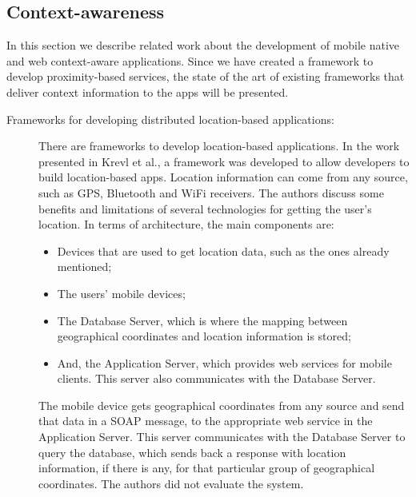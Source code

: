 \subsection{Context-awareness}
\label{sub:frameworks_context_aware}
In this section we describe related work about the
development of mobile native and web
context-aware applications.
Since we have created a framework to develop
proximity-based services, the state
of the art of existing frameworks that deliver
context information to the apps will be presented.
\begin{description}
  \item[Frameworks for developing distributed
  location-based applications:]
  There are frameworks to develop location-based
  applications.
  In the work presented in Krevl et al.\cite{Krevl2006},
  a framework
  was developed to allow developers to build
  location-based apps. Location information can come
  from any source, such as \gls{GPS}, Bluetooth and \gls{WiFi} receivers.
  The authors discuss some benefits and limitations
  of several technologies for getting the
  user's location.
  In terms of architecture, the main components
  are:
  \begin{itemize}
  \item
  Devices that are used to get location data, such as
  the ones already mentioned;
  \item The users' mobile devices;
  \item The Database Server, which is where the mapping
  between geographical coordinates and location
  information is stored;
  \item And, the Application Server, which provides web services for
  mobile clients.
  This server also communicates
  with the Database Server.
  \end{itemize}
  The mobile device gets geographical coordinates
  from any source and send that data in a
  \gls{SOAP}\cite{Seely:2001:SCP:560836} message,
  to the appropriate web service in the Application
  Server. This server communicates with the Database Server
  to query the database, which sends back a response with
  location information, if there is any, for that
  particular group of geographical coordinates.
  The authors did not evaluate the system.


\end{description}
